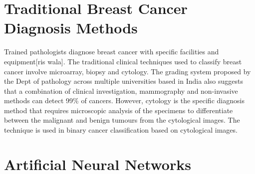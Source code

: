 \section{Traditional Breast Cancer Diagnosis Methods}
Trained pathologists diagnose breast cancer with specific facilities and equipment[ris wala]. The traditional clinical techniques used to classify breast cancer involve microarray, biopsy and cytology\citep{articlediagnosi}. 
The grading system proposed by the Dept of pathology across multiple universities based in India also suggests that a combination of clinical investigation, mammography and non-invasive methods can detect 99\% of cancers.
However, cytology is the specific diagnosis method that requires microscopic analysis of the specimens to differentiate between the malignant and benign tumours from the cytological images\citep{articlediagnosi}. 
The technique is used in binary cancer classification based on cytological images.

\section{Artificial Neural Networks}

